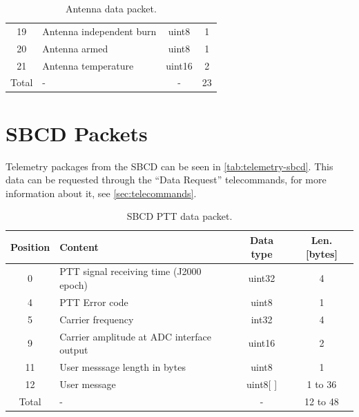 \begin{table}[!ht]
\begin{tabular}{clcc}
		19                  & Antenna independent burn                  & uint8              & 1                     \\
		20                  & Antenna armed                             & uint8              & 1                     \\
		21                  & Antenna temperature                       & uint16             & 2                     \\
		\midrule                                                                                                    
        Total               & -                                         & -                  & 23                    \\
		\bottomrule[1.5pt]
	\end{tabular}
	\caption{Antenna data packet.}
	\label{tab:telemetry-antenna}
\end{table}

\section{SBCD Packets}

Telemetry packages from the SBCD can be seen in \autoref{tab:telemetry-sbcd}. This data can be requested through the ``Data Request'' telecommands, for more information about it, see \autoref{sec:telecommands}.

\begin{table}[!ht]
	\centering
    \small
	\begin{tabular}{clcc}
		\toprule[1.5pt]
		\textbf{Position}   & \textbf{Content}                          & \textbf{Data type} & \textbf{Len. [bytes]} \\
		\midrule                                                                                                         
        0                   & PTT signal receiving time (J2000 epoch)   & uint32             & 4                     \\
		4                   & PTT Error code                            & uint8              & 1                     \\
		5                   & Carrier frequency                         & int32              & 4                     \\
		9                   & Carrier amplitude at ADC interface output & uint16             & 2                     \\
		11                  & User messsage length in bytes             & uint8              & 1                     \\
        12                  & User message                              & uint8[ ]           & 1 to 36               \\
		\midrule                                                                                                    
        Total               & -                                         & -                  & 12 to 48              \\
		\bottomrule[1.5pt]
	\end{tabular}
	\caption{SBCD PTT data packet.}
	\label{tab:telemetry-sbcd}
\end{table}
